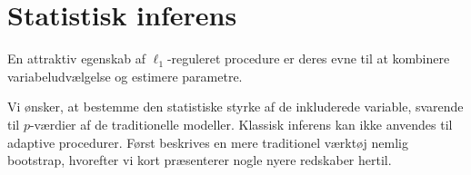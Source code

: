 \chapter{Statistisk inferens} \label{kap:statistisk_inferens}
En attraktiv egenskab af \(\ell_1\)-reguleret procedure er deres evne til at kombinere variabeludvælgelse og estimere parametre. 

Vi ønsker, at bestemme den statistiske styrke af de inkluderede variable, svarende til \(p\)-værdier af de traditionelle modeller.
Klassisk inferens kan ikke anvendes til adaptive procedurer.
Først beskrives en mere traditionel værktøj nemlig bootstrap, hvorefter vi kort præsenterer nogle nyere redskaber hertil.

%
